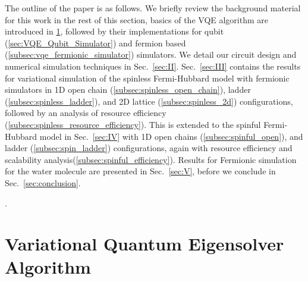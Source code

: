 \documentclass[aps, pra, reprint, superscriptaddress]{revtex4-1}
\begin{document}

The outline of the paper is as follows. We briefly review the background material for this work in the rest of this section, basics of the VQE algorithm are introduced in \ref{sec:VQE}, followed by their implementations for qubit (\ref{sec:VQE_Qubit_Simulator}) and fermion based (\ref{subsec:vqe_fermionic_simulator}) simulators. We detail our circuit design and numerical simulation techniques in Sec.~\ref{sec:II}. Sec.~\ref{sec:III} contains the results for variational simulation of the spinless Fermi-Hubbard model with fermionic simulators in 1D open chain (\ref{subsec:spinless_open_chain}), ladder (\ref{subsec:spinless_ladder}), and 2D lattice (\ref{subsec:spinless_2d}) configurations, followed by an analysis of resource efficiency (\ref{subsec:spinless_resource_efficiency}). This is extended to the spinful Fermi-Hubbard model in Sec.~\ref{sec:IV} with 1D open chains (\ref{subsec:spinful_open}), and ladder (\ref{subsec:spin_ladder}) configurations, again with resource efficiency and scalability analysis(\ref{subsec:spinful_efficiency}). Results for Fermionic simulation for the water molecule are presented in Sec.~\ref{sec:V}, before we conclude in Sec.~\ref{sec:conclusion}. 

. 

\section{Variational Quantum Eigensolver Algorithm}
\label{sec:VQE}
\end{document}
